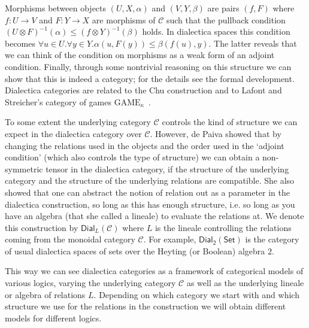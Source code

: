 \documentclass{llncs}
\let\mto\to                     %
\let\to\relax                   %
\newcommand{\to}{\rightarrow}
\newcommand{\cat}[1]{\mathcal{#1}}
\newcommand{\Set}{\mathsf{Set}}
\begin{document}
Morphisms between objects $(U, X, \alpha)$ and $(V, Y, \beta)$ are
pairs $(f, F)$ where $f : U \mto V$ and $F : Y \mto X$ are morphisms
of $\cat{C}$ such that the pullback condition 
$(U \otimes F)^{-1}(\alpha) \leq (f \otimes Y)^{-1}(\beta)$ holds.
In dialectica spaces this condition becomes
$\forall u \in U.\forall y \in Y. \alpha(u , F(y)) \leq \beta(f(u), y)$.
The latter reveals that we can think of the condition on morphisms as
a weak form of an adjoint condition.  Finally, through some nontrivial reasoning
on this structure we can show that this is indeed a category; for the
details see the formal development.  Dialectica categories are related
to the Chu construction \cite{depaiva2007} and to Lafont and Streicher's category of games $\text{GAME}_{\kappa}$~\cite{lafont1991}.

To some extent the underlying category $\cat{C}$ controls the kind of
structure we can expect in the dialectica category over $\cat{C}$. However,
de Paiva  showed \cite{depaiva2007} that by changing the relations used in
the objects and the order used in the  `adjoint condition' (which also
controls the type of structure) we can obtain a non-symmetric tensor in the dialectica category, if the structure of the underlying category and the structure of the underlying relations are compatible. 
She also showed that one can
abstract the notion of relation out as a parameter in the dialectica
construction, so long as this has enough structure, i.e. so long as you have an algebra (that she called a lineale) to evaluate the relations at. 
We denote this construction by $\mathsf{Dial}_{L}(\cat{C})$ where $L$ is the lineale controlling the relations coming from the monoidal category $\cat{C}$. For example, $\mathsf{Dial}_{\mathsf{2}}(\Set)$ is the
category of usual dialectica spaces of sets over the Heyting (or Boolean) algebra $2$. 

This way we can see dialectica categories as a framework of categorical models of various logics, varying the underlying category $\cat{C}$ as well as the underlying lineale or algebra of relations $L$. Depending on which category we start with and which structure we use for the relations in the construction we will obtain different models for different logics.
\end{document}
